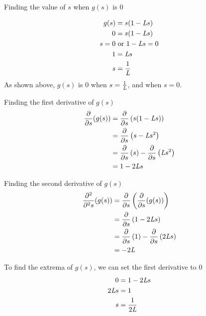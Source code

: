 \documentclass{exam}
\begin{document}
\begin{questions}
\begin{parts}
{            Finding the value of $s$ when $g(s)$ is 0

            \begin{align*}
                g(s)     & = s(1 - \emph{L}s)            \\
                0        & = s(1 - \emph{L}s)            \\
                s    = 0 & \text{ or } 1 - \emph{L}s = 0 \\
                1        & = \emph{L}s                   \\
                s        & = \frac{1}{\emph{L}}
            \end{align*}
            As shown above, $g(s)$ is 0 when $s = \frac{1}{\emph{L}}$, and when $s = 0$.

            Finding the first derivative of $g(s)$
            \begin{align*}
                \frac{\partial}{\partial s} (g(s)) & = \frac{\partial}{\partial s} \left( s(1 - \emph{L} s) \right)                                           \\
                                                   & = \frac{\partial}{\partial s} \left( s - \emph{L} s^2 \right)                                            \\
                                                   & = \frac{\partial}{\partial s} \left( s \right) - \frac{\partial}{\partial s} \left( \emph{L} s^2 \right) \\
                                                   & = 1 - 2\emph{L}s
            \end{align*}

            Finding the second derivative of $g(s)$
            \begin{align*}
                \frac{\partial^2}{\partial^2 s} (g(s)) & = \frac{\partial}{\partial s} \left(\frac{\partial}{\partial s} (g(s))\right)                       \\
                                                       & = \frac{\partial}{\partial s} \left(1 - 2\emph{L}s\right)                                           \\
                                                       & = \frac{\partial}{\partial s} \left(1 \right) - \frac{\partial}{\partial s} \left(2\emph{L}s\right) \\
                                                       & = -2\emph{L}
            \end{align*}

            To find the extrema of $g(s)$, we can set the first derivative to 0
            \begin{align*}
                0          & = 1 - 2\emph{L}s      \\
                2\emph{L}s & = 1                   \\
                s          & = \frac{1}{2\emph{L}}
            \end{align*}

}
\end{parts}
\end{questions}
\end{document}
